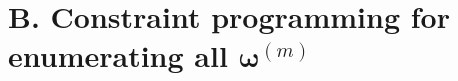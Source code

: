 \documentclass[useAMS, usenatbib, referee]{biom}\usepackage[]{graphicx}\usepackage[]{color}
\begin{document}







\section{B. Constraint programming for enumerating all $\bm{\omega}^{(m)}$}
\label{appx:constrprog}
\end{document}
